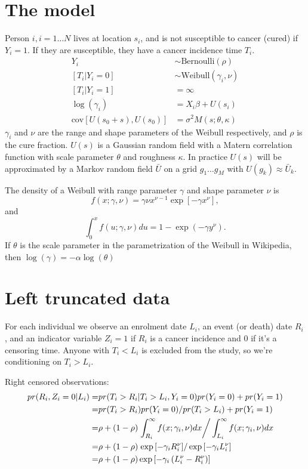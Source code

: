 \documentclass{article}
\begin{document}
\section{The model}
Person $i, i=1\ldots N$ lives at location $s_i$, and is not susceptible to cancer (cured) if $Y_i=1$.  If they are susceptible, they have a cancer incidence time $T_i$.
\begin{align*}
Y_i & \sim \text{Bernoulli}(\rho)\\
[T_i | Y_i = 0] &\sim \text{Weibull}(\gamma_i, \nu)\\
[T_i | Y_i = 1] & = \infty \\
\log(\gamma_i) &= X_i \beta + U(s_i)\\
\text{cov}[U(s_0 + s), U(s_0)] &= \sigma^2 M(s; \theta, \kappa) 
\end{align*}
$\gamma_i$ and $\nu$ are the range and shape parameters of the Weibull respectively, and $\rho$ is the cure fraction.  $U(s)$ is a Gaussian random field with a Matern correlation function with scale parameter $\theta$ and roughness $\kappa$.  In practice $U(s)$ will be approximated by a Markov random field $\bar U$ on a grid $g_1 \ldots g_M$ with $U(g_k) \approx \bar U_k$.



The density of a Weibull with range parameter $\gamma$ and shape parameter $\nu$ is 
\[
f(x;\gamma,\nu) =  \gamma \nu x^{\nu-1} \exp\left[-	\gamma x^\nu\right],
\]
and
\[
\int_0^x f(u;\gamma,\nu)du = 1-\exp(-\gamma y^\nu).
\]
If $\theta$ is the scale parameter in the parametrization of the Weibull in Wikipedia, then 
$\log(\gamma) = -\alpha\log(\theta)$


\section{Left truncated data}
For each individual we observe an enrolment date $L_i$, an event (or death) date $R_i$, and an indicator variable $Z_i = 1$ if $R_i$ is a cancer incidence and 0 if it's a censoring time. Anyone with $T_i < L_i$ is excluded from the study, so we're conditioning on $T_i > L_i$.  

Right censored observations:
\begin{align*}
pr(R_i, Z_i=0 | L_i) =& pr(T_i > R_i | T_i > L_i, Y_i =0) pr(Y_i =0)  + pr(Y_i =1)\\
=&pr(T_i > R_i) pr(Y_i = 0)/pr(T_i > L_i) + pr(Y_i =1)\\
=& \rho + (1-\rho) \left. \int_{R_i}^\infty f(x;\gamma_i, \nu) dx \right/\int_{L_i}^\infty f(x;\gamma_i, \nu) dx  \\
= &  \rho + (1-\rho) \left. \exp\left[-\gamma_i R_i^\nu\right] \right/\exp\left[-\gamma_i L_i^\nu\right]\\
= &  \rho + (1-\rho) \exp\left[-\gamma_i\left(L_i^\nu -R_i^\nu\right)\right] \\
\end{align*}
\end{document}
